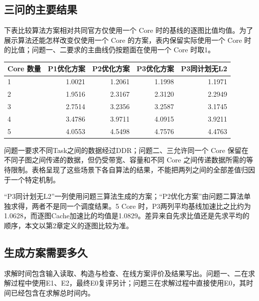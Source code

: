 \documentclass[anonymous,notoc]{gmcm2026}
\begin{document}
\subsection{三问的主要结果}

下表比较算法方案相对共同官方仅使用一个 Core 时的基线的逐图比值均值。为了展示算法还能怎样改变仅使用一个 Core 的方案，表内保留实际使用一个 Core 时的比值；问题一、二要求的主曲线仍按题面在使用一个 Core 时取1。

{\def\LTcaptype{table} %
\begin{table}[!htbp]\centering\small
\begin{tabular}{@{}lrrrr@{}}
\toprule\noalign{}
Core 数量 & P1优化方案 & P2优化方案 & P3优化方案 & P3同计划无L2 \\
\midrule\noalign{}


1 & 1.0021 & 1.2061 & 1.1998 & 1.1971 \\
2 & 1.9516 & 2.3167 & 2.3120 & 2.2949 \\
3 & 2.7514 & 3.2356 & 3.2587 & 3.1745 \\
4 & 3.4786 & 3.9711 & 4.0915 & 3.9211 \\
5 & 4.0553 & 4.5498 & 4.7576 & 4.4763 \\
\bottomrule\end{tabular}
\end{table}
}

问题一要求不同Task之间的数据经过DDR；问题二、三允许同一个 Core 保留在不同子图之间传递的数据，但仍受带宽、容量和不同 Core 之间传递数据所需的等待限制。表格呈现了这些场景下各自算法的结果，不能把两列之间的全部差值归因于一个特定机制。

``P3同计划无L2''一列使用问题三算法生成的方案；``P2优化方案''由问题二算法单独求得，两者不是同一个调度结果。5 Core 时，P3两列平均基线加速比之比约为1.0628，而逐图Cache加速比的均值是1.0829。差异来自先求比值还是先求平均的顺序，本文以第2章定义的逐图比较为准。

\subsection{生成方案需要多久}

求解时间包含输入读取、构造与检查、在线方案评价及结果写出。问题一、二在求解过程中使用E1、E2，最终E0复评另计；问题三在求解过程中直接使用E0，其时间已经包含在求解总时间内。
\end{document}
